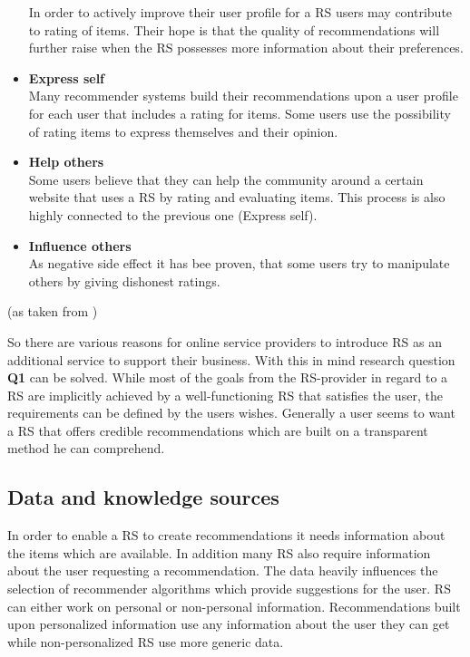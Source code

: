 \begin{itemize}
        In order to actively improve their user profile for a RS users may contribute to rating of items.
        Their hope is that the quality of recommendations will further raise when the RS possesses more information about their preferences.
    \item\textbf{Express self}\hfill\\
        Many recommender systems build their recommendations upon a user profile for each user that includes a rating for items.
        Some users use the possibility of rating items to express themselves and their opinion.
    \item\textbf{Help others}\hfill\\
        Some users believe that they can help the community around a certain website that uses a RS by rating and evaluating items.
        This process is also highly connected to the previous one (Express self).
    \item\textbf{Influence others}\hfill\\
        As negative side effect it has bee proven, that some users try to manipulate others by giving dishonest ratings.
\end{itemize}
(as taken from \citep[p.~13-17]{herlocker:2004})

So there are various reasons for online service providers to introduce RS as an additional service to support their business.
With this in mind research question \textbf{Q1} can be solved.
While most of the goals from the RS-provider in regard to a RS are implicitly achieved by a well-functioning RS that satisfies the user, the requirements can be defined by the users wishes.
Generally a user seems to want a RS that offers credible recommendations which are built on a transparent method he can comprehend.



\subsection{Data and knowledge sources}
\label{sec:data-knowledge-source}
In order to enable a RS to create recommendations it needs information about the items which are available.
In addition many RS also require information about the user requesting a recommendation.
The data heavily influences the selection of recommender algorithms which provide suggestions for the user.
\citep[p.~7-8]{ricci:2011}
RS can either work on personal or non-personal information.
Recommendations built upon personalized information use any information about the user they can get while non-personalized RS use more generic data.

